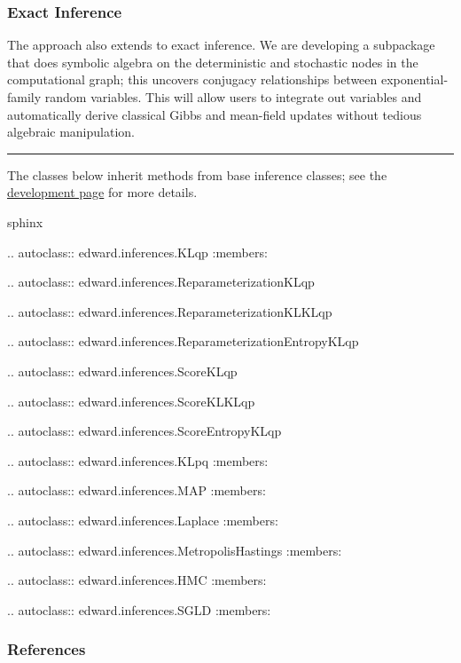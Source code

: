 \subsubsection{Exact Inference}

The approach also extends to exact inference. We are developing a
subpackage that does symbolic algebra on the deterministic and
stochastic nodes in the computational graph; this uncovers conjugacy
relationships between exponential-family random variables. This will
allow users to integrate out variables and automatically derive
classical Gibbs and mean-field updates \citep{bishop2006pattern} without
tedious algebraic manipulation.

\begin{center}\rule{3in}{0.4pt}\end{center}

The classes below inherit methods from base inference classes;
see the \href{/api/inference-development}{development page} for more
details.

{{sphinx

.. autoclass:: edward.inferences.KLqp
   :members:

.. autoclass:: edward.inferences.ReparameterizationKLqp

.. autoclass:: edward.inferences.ReparameterizationKLKLqp

.. autoclass:: edward.inferences.ReparameterizationEntropyKLqp

.. autoclass:: edward.inferences.ScoreKLqp

.. autoclass:: edward.inferences.ScoreKLKLqp

.. autoclass:: edward.inferences.ScoreEntropyKLqp

.. autoclass:: edward.inferences.KLpq
   :members:

.. autoclass:: edward.inferences.MAP
   :members:

.. autoclass:: edward.inferences.Laplace
   :members:

.. autoclass:: edward.inferences.MetropolisHastings
   :members:

.. autoclass:: edward.inferences.HMC
   :members:

.. autoclass:: edward.inferences.SGLD
   :members:

}}

\subsubsection{References}\label{references}
